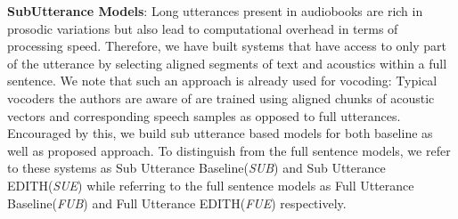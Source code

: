 \textbf{SubUtterance Models}: Long utterances present in audiobooks  are rich in prosodic variations but also lead to computational overhead in terms of processing speed. Therefore, we have built systems that have access to only part of the utterance by selecting aligned segments of text and acoustics within a full sentence. We note that such an approach is already used for vocoding: Typical vocoders the authors are aware of are trained using aligned chunks of acoustic vectors and corresponding speech samples  as opposed to full utterances. Encouraged by this, we build sub utterance based models for both baseline as well as proposed approach. To distinguish from the full sentence models, we refer to these systems as Sub Utterance Baseline(\textit{SUB}) and Sub Utterance EDITH(\textit{SUE}) while referring to the full sentence models as Full Utterance Baseline(\textit{FUB}) and Full Utterance EDITH(\textit{FUE}) respectively.


